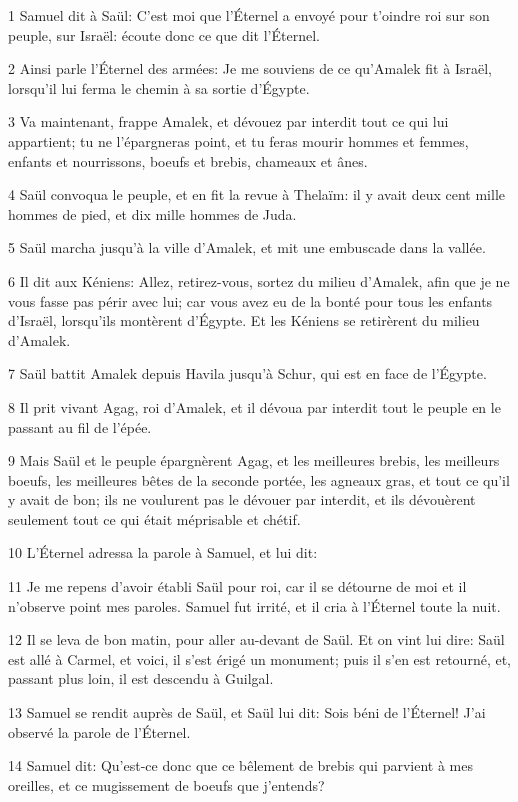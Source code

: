\par 1 Samuel dit à Saül: C'est moi que l'Éternel a envoyé pour t'oindre roi sur son peuple, sur Israël: écoute donc ce que dit l'Éternel.
\par 2 Ainsi parle l'Éternel des armées: Je me souviens de ce qu'Amalek fit à Israël, lorsqu'il lui ferma le chemin à sa sortie d'Égypte.
\par 3 Va maintenant, frappe Amalek, et dévouez par interdit tout ce qui lui appartient; tu ne l'épargneras point, et tu feras mourir hommes et femmes, enfants et nourrissons, boeufs et brebis, chameaux et ânes.
\par 4 Saül convoqua le peuple, et en fit la revue à Thelaïm: il y avait deux cent mille hommes de pied, et dix mille hommes de Juda.
\par 5 Saül marcha jusqu'à la ville d'Amalek, et mit une embuscade dans la vallée.
\par 6 Il dit aux Kéniens: Allez, retirez-vous, sortez du milieu d'Amalek, afin que je ne vous fasse pas périr avec lui; car vous avez eu de la bonté pour tous les enfants d'Israël, lorsqu'ils montèrent d'Égypte. Et les Kéniens se retirèrent du milieu d'Amalek.
\par 7 Saül battit Amalek depuis Havila jusqu'à Schur, qui est en face de l'Égypte.
\par 8 Il prit vivant Agag, roi d'Amalek, et il dévoua par interdit tout le peuple en le passant au fil de l'épée.
\par 9 Mais Saül et le peuple épargnèrent Agag, et les meilleures brebis, les meilleurs boeufs, les meilleures bêtes de la seconde portée, les agneaux gras, et tout ce qu'il y avait de bon; ils ne voulurent pas le dévouer par interdit, et ils dévouèrent seulement tout ce qui était méprisable et chétif.
\par 10 L'Éternel adressa la parole à Samuel, et lui dit:
\par 11 Je me repens d'avoir établi Saül pour roi, car il se détourne de moi et il n'observe point mes paroles. Samuel fut irrité, et il cria à l'Éternel toute la nuit.
\par 12 Il se leva de bon matin, pour aller au-devant de Saül. Et on vint lui dire: Saül est allé à Carmel, et voici, il s'est érigé un monument; puis il s'en est retourné, et, passant plus loin, il est descendu à Guilgal.
\par 13 Samuel se rendit auprès de Saül, et Saül lui dit: Sois béni de l'Éternel! J'ai observé la parole de l'Éternel.
\par 14 Samuel dit: Qu'est-ce donc que ce bêlement de brebis qui parvient à mes oreilles, et ce mugissement de boeufs que j'entends?
